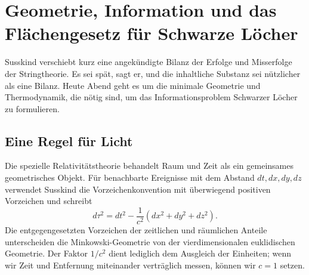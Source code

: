 \chapter{Geometrie, Information und das Flächengesetz für Schwarze Löcher}


Susskind verschiebt kurz eine angekündigte Bilanz der Erfolge und Misserfolge der Stringtheorie. Es sei spät, sagt er, und die inhaltliche Substanz sei nützlicher als eine Bilanz. Heute Abend geht es um die minimale Geometrie und Thermodynamik, die nötig sind, um das Informationsproblem Schwarzer Löcher zu formulieren.

\section{Eine Regel für Licht}

Die spezielle Relativitätstheorie behandelt Raum und Zeit als ein gemeinsames geometrisches Objekt. Für benachbarte Ereignisse mit dem Abstand \(dt,dx,dy,dz\) verwendet Susskind die Vorzeichenkonvention mit überwiegend positiven Vorzeichen und schreibt
\begin{equation}
d\tau^2=dt^2-\frac{1}{c^2}\left(dx^2+dy^2+dz^2\right).
\end{equation}
Die entgegengesetzten Vorzeichen der zeitlichen und räumlichen Anteile unterscheiden die Minkowski-Geometrie von der vierdimensionalen euklidischen Geometrie. Der Faktor \(1/c^2\) dient lediglich dem Ausgleich der Einheiten; wenn wir Zeit und Entfernung miteinander verträglich messen, können wir \(c=1\) setzen.

